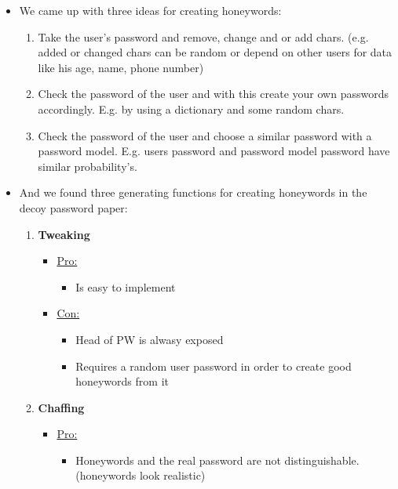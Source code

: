 \begin{enumerate}[(a)]
\begin{enumerate}[1.]
\begin{itemize}
            \item We came up with three ideas for creating honeywords:
            \begin{enumerate}[1.]
                \item Take the user's password and remove, change and or add chars. (e.g. added or changed chars can be random or depend on other users for data like his age, name, phone number)
                \item Check the password of the user and with this create your own passwords accordingly. E.g. by using a dictionary and some random chars.
                \item Check the password of the user and choose a similar password with a password model. E.g. users password and password model password have similar probability's. 
            \end{enumerate}
            
            \item And we found three generating functions for creating honeywords in the decoy password paper:
            \begin{enumerate}[1.]
                \item \textbf{Tweaking}
                \begin{itemize}
                    \item \underline{Pro:}
                    \begin{itemize}
                        \item Is easy to implement
                    \end{itemize}
                
                    \item \underline{Con:}
                    \begin{itemize}
                        \item Head of PW is alwasy exposed
                        \item Requires a random user password in order to create good honeywords from it
                    \end{itemize}
                \end{itemize}
                
                \item \textbf{Chaffing}
                \begin{itemize}
                    \item \underline{Pro:}
                    \begin{itemize}
                        \item Honeywords and the real password are not distinguishable. (honeywords look realistic)
                    \end{itemize}
                

\end{itemize}
\end{enumerate}
\end{itemize}
\end{enumerate}
\end{enumerate}
